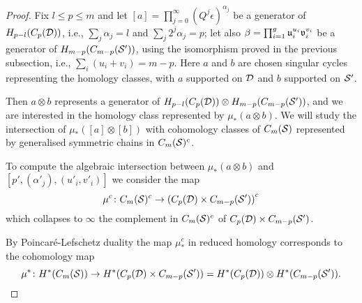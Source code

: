 \begin{proof}
Fix $l\leq p\leq m$ and let $[a]=\prod_{j=0}^{\infty}(Q^j\epsilon)^{\alpha_j}$ be a generator of
$H_{p-l}(C_p(\D))$, i.e., $\sum_j\alpha_j=l$ and $\sum_j2^j\alpha_j=p$; let also
$\beta=\prod_{i=1}^g \u_i^{u_i}\v_i^{v_i}$ be a generator of $H_{m-p}(C_{m-p}(\S'))$, using the
isomorphism proved in the previous subsection, i.e., $\sum_i(u_i+v_i)=m-p$. Here $a$ and
$b$ are chosen singular cycles representing the homology classes, with $a$ supported on $\D$
and $b$ supported on $\S'$.

Then $a\otimes b$ represents a generator of $H_{p-l}(C_p(\D))\otimes H_{m-p}(C_{m-p}(\S'))$,
and we are interested in the homology class represented by $\mu_*(a\otimes b)$.
We will study
the intersection of $\mu_*([a]\otimes [b])$ with cohomology classes of $\cms$ represented by
generalised symmetric chains in $\cms^c$.




% 

To compute the algebraic intersection
between $\mu_*(a\otimes b)$ and $[p',(\alpha'_j),(u'_i,v'_i)]$ we
consider the map
\[
 \mu^c\colon \cms^c\to \pa{C_p(\D)\times C_{m-p}(\S')}^c
\]
which collapses to $\infty$ the complement in $\cms^c$ of $C_p(\D)\times C_{m-p}(\S')$.

By Poincaré-Lefschetz duality the map $\mu^c_*$ in reduced homology corresponds to the cohomology map
\[
 \mu^*\colon H^*(\cms)\to H^*(C_p(\D)\times C_{m-p}(\S'))=H^*(C_p(\D))\otimes H^*(C_{m-p}(\S')).
\]


\end{proof}
